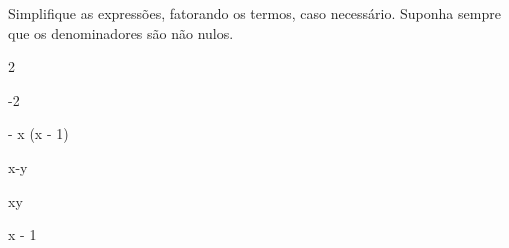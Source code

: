     
\begin{exercicio}
  Simplifique as expressões, fatorando os termos, caso necessário. 
  Suponha sempre que os denominadores são não nulos.
  \begin{mathlist}[2]
      \item {}
      \item {}
      \item {}
      \item {}
      \item {}
      \item {}
      \item {}
      \item {}
      \item {}
      \item {}
      \item {}
      \item {}
  \end{mathlist}
  \begin{answers}
      \begin{mathlist}[2]
        \item 2
        \item -2
        \item {}
        \item {}
        \item {}
        \item - x \left(x - 1\right)
        \item {}
        \item x-y
        \item xy
        \item {}
        \item {}
        \item x - 1
    \end{mathlist}
  \end{answers}
\end{exercicio}

